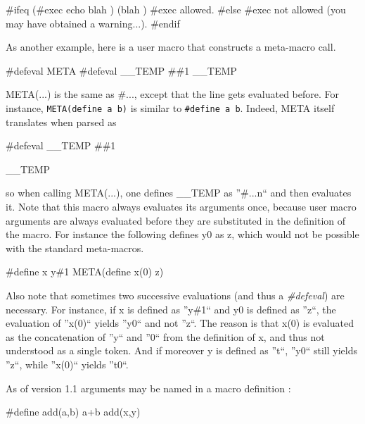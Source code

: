 \begin{PRE}
   \#ifeq (\#exec echo blah
   ) (blah
   )
   {\htmlBackslash}\#exec allowed.
   \#else
   {\htmlBackslash}\#exec not allowed (you may have obtained a warning...).
   \#endif
\end{PRE}

As another example, here is a user macro that constructs a meta-macro call. 

\begin{PRE}
   \#defeval META {\htmlBackslash}\#defeval {\htmlBackslash}\_\_TEMP {\htmlBackslash}{\htmlBackslash}{\htmlBackslash}\#{\htmlBackslash}\#1{\htmlBackslash}{\htmlBackslash}{\htmlBackslash}
   {\htmlBackslash}
   {\htmlBackslash}\_\_TEMP
\end{PRE}

META(...) is the same as \#..., except that the line gets evaluated before.
For instance, {\tt META(define {\htmlBackslash}a {\htmlBackslash}b)} is
similar to {\tt \#define a b}. Indeed, META itself translates when parsed as 

\begin{PRE}
   \#defeval \_\_TEMP {\htmlBackslash}\#\#1{\htmlBackslash}
   
   \_\_TEMP
\end{PRE}

so when calling META(...), one defines \_\_TEMP as ''\#...{\htmlBackslash}n``
and then evaluates it. Note that this macro always evaluates its arguments
once, because user macro arguments are always evaluated before they are
substituted in the definition of the macro. For instance the following defines
y0 as z, which would not be possible with the standard meta-macros. 

\begin{PRE}
   \#define x y\#1
   META(define x(0) z)
\end{PRE}

Also note that sometimes two successive evaluations (and thus a {\it
\#defeval}) are necessary. For instance, if x is defined as ''y\#1`` and y0 is
defined as ''z``, the evaluation of ''x(0)`` yields ''y0`` and not ''z``. The
reason is that x(0) is evaluated as the concatenation of ''y`` and ''0`` from
the definition of x, and thus not understood as a single token. And if
moreover y is defined as ''t``, ''y0`` still yields ''z``, while ''x(0)``
yields ''t0``. 

As of version 1.1 arguments may be named in a macro definition : 

\begin{PRE}
   \#define add(a,b) a+b
   add(x,y)
\end{PRE}

